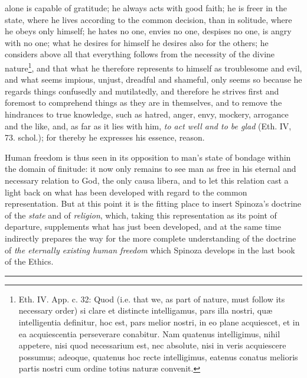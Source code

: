 \documentclass[12pt,a4paper,openany]{book}
\newcommand{\opage}[1]{\marginnote{\footnotesize\textit{[#1]}}}
\begin{document}
alone is capable of gratitude; he always acts with good
faith; he is freer in the state, where he lives according to the common
decision, than in solitude, where he obeys only
himself; he hates no one, envies no one, despises no one,
is angry with no one; what he desires for himself he desires
also for the others; he considers above all that everything
follows from the necessity of the divine nature\footnote{Eth. IV. App. c. 32: Quod (i.e. that we, as part of nature, must
follow its necessary order) si clare et distincte intelligamus, pars
illa nostri, quæ intelligentia definitur, hoc est, pars melior nostri,
in eo plane acquiescet, et in ea acquiescentia perseverare conabitur.
Nam quatenus intelligimus, nihil appetere, nisi quod necessarium
est, nec absolute, nisi in veris acquiescere possumus; adeoque,
quatenus hoc recte intelligimus, eatenus conatus melioris partis nostri
cum ordine totius naturæ convenit.}, and that
what he therefore represents to himself as troublesome and evil, and
what seems impious, unjust, dreadful and shameful,
only seems so because he regards things confusedly and
mutilatedly, and therefore he strives first and foremost to
comprehend things as they are in themselves, and to remove the hindrances
to true knowledge, such as hatred, anger, envy,
mockery, arrogance and the like, and, as far as it lies with him, \emph{to
act well and to be glad} (Eth. IV, 73. schol.); for
thereby he expresses his essence, reason.

Human freedom is thus seen in its opposition
to man's state of bondage within the domain of
finitude: it now only remains to see man
as free in his eternal and necessary relation to God, the
\opage{132} only causa libera, and to let this relation cast a light back on what has been developed with regard to the common representation. But at this point it is the fitting place to insert Spinoza's doctrine of the \emph{state} and of \emph{religion}, which, taking this representation as its point of departure, supplements what has just been developed, and at the same time indirectly prepares the way for the more complete understanding of the doctrine of \emph{the eternally existing human freedom} which Spinoza develops in the last book of the Ethics.

\bigskip
\begin{center}\rule{2.5cm}{0.4pt}\end{center}
\bigskip
\end{document}
